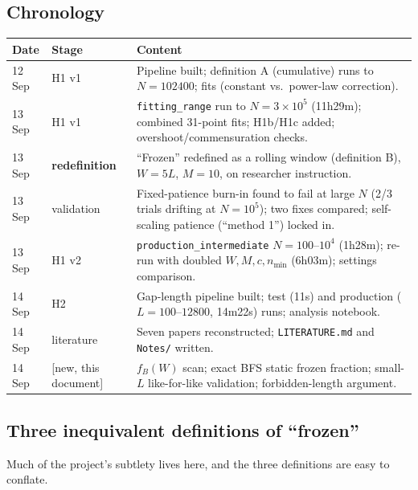 \documentclass[11pt,a4paper]{article}
\newcommand{\NEW}{\textcolor{blue!55!black}{\textsf{\small[new, this document]}}}
\begin{document}
\subsection{Chronology}
\begin{center}\small
\begin{tabular}{@{}llp{9.4cm}@{}}
\toprule
Date & Stage & Content \\
\midrule
12 Sep & H1 v1 & Pipeline built; definition A (cumulative) runs to
$N=102400$; fits (constant vs.\ power-law correction). \\
13 Sep & H1 v1 & \texttt{fitting\_range} run to $N=3\times10^5$ (11h29m);
combined 31-point fits; H1b/H1c added; overshoot/commensuration checks. \\
13 Sep & \textbf{redefinition} & ``Frozen'' redefined as a rolling window
(definition B), $W=5L$, $M=10$, on researcher instruction. \\
13 Sep & validation & Fixed-patience burn-in found to fail at large $N$
(2/3 trials drifting at $N=10^5$); two fixes compared; self-scaling
patience (``method 1'') locked in. \\
13 Sep & H1 v2 & \texttt{production\_intermediate} $N=100$--$10^4$ (1h28m);
re-run with doubled $W,M,c,n_{\min}$ (6h03m); settings comparison. \\
14 Sep & H2 & Gap-length pipeline built; test (11s) and production
($L=100$--$12800$, 14m22s) runs; analysis notebook. \\
14 Sep & literature & Seven papers reconstructed; \texttt{LITERATURE.md}
and \texttt{Notes/} written. \\
14 Sep & \NEW & $f_B(W)$ scan; exact BFS static frozen fraction;
small-$L$ like-for-like validation; forbidden-length argument. \\
\bottomrule
\end{tabular}
\end{center}

\subsection{Three inequivalent definitions of ``frozen''}
Much of the project's subtlety lives here, and the three definitions are
easy to conflate.
\end{document}
